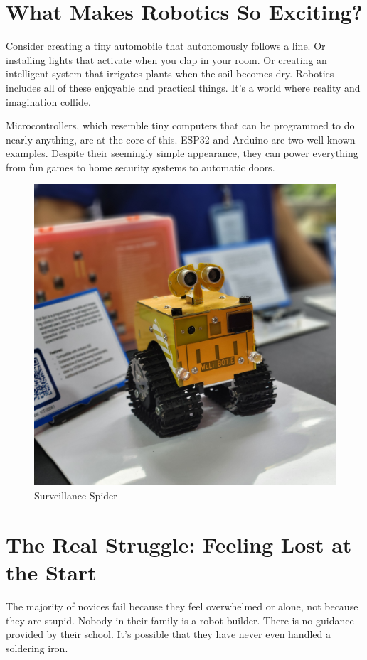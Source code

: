 \documentclass[a4paper,10pt,twocolumn]{memoir}
\begin{document}
\section*{What Makes Robotics So Exciting?}
Consider creating a tiny automobile that autonomously follows a line. Or installing lights that activate when you clap in your room. Or creating an intelligent system that irrigates plants when the soil becomes dry. Robotics includes all of these enjoyable and practical things. It’s a world where reality and imagination collide.

Microcontrollers, which resemble tiny computers that can be programmed to do nearly anything, are at the core of this. ESP32 and Arduino are two well-known examples. Despite their seemingly simple appearance, they can power everything from fun games to home security systems to automatic doors.

\begin{figure}[ht]
  \centering
  \includegraphics[width=\columnwidth]{spider.jpg}
  \caption*{Surveillance Spider}
  \label{fig2}
\end{figure}

\section*{The Real Struggle: Feeling Lost at the Start}
The majority of novices fail because they feel overwhelmed or alone, not because they are stupid. Nobody in their family is a robot builder. There is no guidance provided by their school. It’s possible that they have never even handled a soldering iron.
\end{document}
